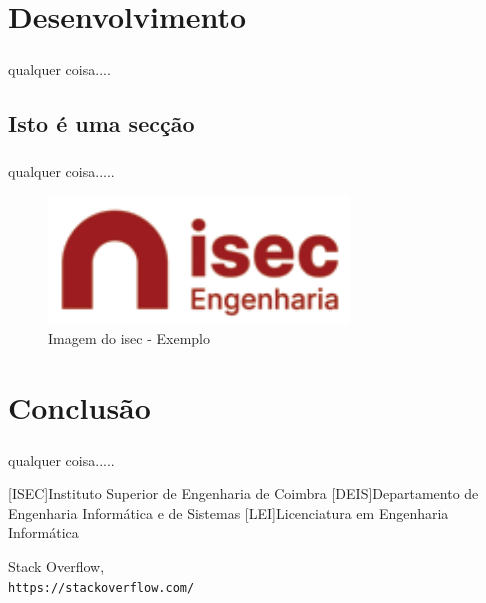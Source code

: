 \documentclass{report}
\begin{document}
\chapter{Desenvolvimento}\label{Uma label qualquer}
\paragraph{}qualquer coisa....


\section{Isto é uma secção}
\paragraph{}qualquer coisa.....

\begin{figure}[H]
\center
\includegraphics[width=8cm]{imagens/isec.png}
\caption{Imagem do isec - Exemplo}
\label{fig.nav}
\end{figure}

\chapter{Conclusão}\label{Conclusão}
\paragraph{}qualquer coisa.....





\begin{acronym}
[ISEC]{Instituto Superior de Engenharia de Coimbra}
[DEIS]{Departamento de Engenharia Informática e de Sistemas}
[LEI]{Licenciatura em Engenharia Informática}
\end{acronym}


\begin{thebibliography}{9}
Stack Overflow,
\\\texttt{https://stackoverflow.com/}

\end{thebibliography}
\end{document}
